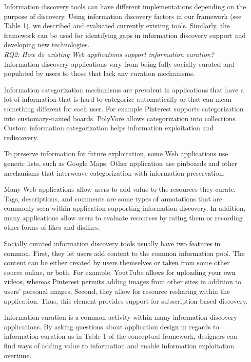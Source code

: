 \documentclass{casconpaper}
\begin{document}
{Information discovery tools can have different implementations depending on the purpose of discovery. Using information discovery factors in our framework (see Table 1), we described and evaluated currently existing tools. Similarly, the framework can be used for identifying gaps in information discovery support and developing new technologies.   \\

\emph{RQ2: How do existing Web applications support information curation?}\\

Information discovery applications vary from being fully socially curated and populated by users to those that lack any curation mechanisms. 

Information categorization mechanisms are prevalent in applications that have a lot of information that is hard to categorize automatically or that can mean something different for each user. For example Pinterest supports categorization into customary-named boards. PolyVore allows categorization into collections. Custom information categorization helps information exploitation and rediscovery. 

To preserve information for future exploitation, some Web applications use generic lists, such as Google Maps. Other application use pinboards and other mechanisms that interweave categorization with information preservation.  

Many Web applications allow users to add value to the resources they curate. Tags, descriptions, and comments are some types of annotations that are commonly seen within application supporting information discovery. In addition, many applications allow users to evaluate resources by rating them or recording other forms of likes and dislikes.

Socially curated information discovery tools usually have two features in common. First, they let users add content to the common information pool. The content can be either created by users themselves or taken from some other source online, or both. For example, YoutTube allows for uploading your own videos, whereas Pinterest permits adding images from other sites in addition to users' personal images. Second, they allow for resource resharing within the application. Thus, this element provides support for subscription-based discovery.

Information curation is a common activity within many information discovery applications. By asking questions about application design in regards to information curation as in Table 1 of the conceptual framework, designers can find ways of adding value to information and enable information exploitation overtime.  
 
} %
\end{document}
